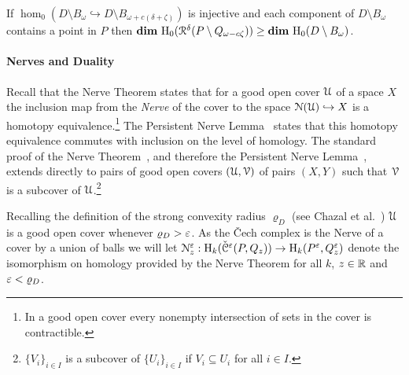 \begin{lemma}\label{lem:assumption2}
  If $\hom_0(D\setminus B_\omega\hookrightarrow D\setminus B_{\omega+c(\delta+\zeta)})$ is injective and each component of $D\setminus B_\omega$ contains a point in $P$ then $\mathbf{dim}~\mathrm{H}_0(\mathcal{R}^\delta(P\setminus Q_{\omega-c\zeta})) \geq \mathbf{dim}~\mathrm{H}_0(D\setminus B_\omega)$.
\end{lemma}

\paragraph*{Nerves and Duality}

Recall that the Nerve Theorem states that for a good open cover $\mathcal{U}$ of a space $X$ the inclusion map from the \emph{Nerve} of the cover to the space $\mathcal{N}(\mathcal{U})\hookrightarrow X$ is a homotopy equivalence.\footnote{In a good open cover every nonempty intersection of sets in the cover is contractible.}
The Persistent Nerve Lemma~\cite{chazal08towards} states that this homotopy equivalence commutes with inclusion on the level of homology.
The standard proof of the Nerve Theorem~\cite{kozlov07combinatorial}, and therefore the Persistent Nerve Lemma~\cite{chazal08towards}, extends directly to pairs of good open covers $(\mathcal{U}, \mathcal{V})$ of pairs $(X, Y)$ such that $\mathcal{V}$ is a subcover of $\mathcal{U}$.\footnote{$\{V_i\}_{i\in I}$ is a subcover of $\{U_i\}_{i\in I}$ if $V_i\subseteq U_i$ for all $i\in I$.}

Recalling the definition of the strong convexity radius $\varrho_D$ (see Chazal et al.~\cite{chazal09analysis}) $\mathcal{U}$ is a good open cover whenever $\varrho_D > \varepsilon$.
As the \v Cech complex is the Nerve of a cover by a union of balls we will let $\mathcal{N}_z^\varepsilon : \mathrm{H}_k(\check{\mathcal{C}}^\varepsilon(P,Q_z))\to \mathrm{H}_k(P^\varepsilon, Q_z^\varepsilon)$ denote the isomorphism on homology provided by the Nerve Theorem for all $k$, $z\in\mathbb{R}$ and $\varepsilon < \varrho_D$.

